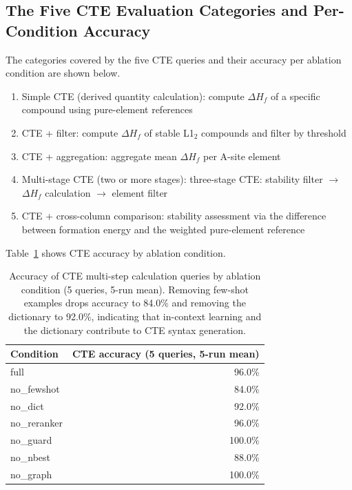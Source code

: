 \subsection{The Five CTE Evaluation Categories and Per-Condition Accuracy}
\label{sec:cte_evaluation}

The categories covered by the five CTE queries and their accuracy per ablation condition are shown below.

\begin{enumerate}[nosep]
  \item Simple CTE (derived quantity calculation):
    compute $\Delta H_f$ of a specific compound using pure-element references
  \item CTE + filter:
    compute $\Delta H_f$ of stable L1$_2$ compounds and filter by threshold
  \item CTE + aggregation:
    aggregate mean $\Delta H_f$ per A-site element
  \item Multi-stage CTE (two or more stages):
    three-stage CTE: stability filter $\to$ $\Delta H_f$ calculation $\to$ element filter
  \item CTE + cross-column comparison:
    stability assessment via the difference between formation energy and the weighted pure-element reference
\end{enumerate}

Table~\ref{tab:cte_results} shows CTE accuracy by ablation condition.

\begin{table}[t]
\centering
\caption{Accuracy of CTE multi-step calculation queries by ablation condition (5 queries, 5-run mean). Removing few-shot examples drops accuracy to 84.0\% and removing the dictionary to 92.0\%, indicating that in-context learning and the dictionary contribute to CTE syntax generation.}
\label{tab:cte_results}
\small
\begin{tabular}{@{}lr@{}}
\toprule
Condition & CTE accuracy (5 queries, 5-run mean) \\
\midrule
full          & 96.0\% \\
no\_fewshot   & 84.0\% \\
no\_dict      & 92.0\% \\
no\_reranker  & 96.0\% \\
no\_guard     & 100.0\% \\
no\_nbest     & 88.0\% \\
no\_graph     & 100.0\% \\
\bottomrule
\end{tabular}
\end{table}


